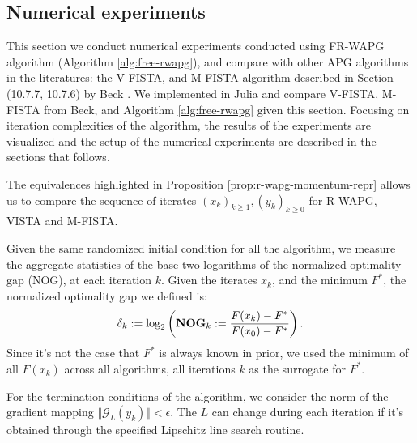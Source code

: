 \documentclass[12pt]{article}
\begin{document}
    \subsection{Numerical experiments}
        This section we conduct numerical experiments conducted using FR-WAPG algorithm (Algorithm \ref{alg:free-rwapg}), and compare with other APG algorithms in the literatures: the V-FISTA, and M-FISTA algorithm described in Section (10.7.7, 10.7.6) by Beck \cite{beck_first-order_2017}. 
        We implemented in Julia \cite{bezanson_julia_2017} and compare V-FISTA, M-FISTA from Beck, and Algorithm \ref{alg:free-rwapg} given this section. 
        Focusing on iteration complexities of the algorithm, the results of the experiments are visualized and the setup of the numerical experiments are described  in the sections that follows. 
        \par
        The equivalences highlighted in Proposition \ref{prop:r-wapg-momentum-repr} allows us to compare the sequence of iterates $(x_k)_{k \ge 1}, (y_k)_{k \ge0}$ for R-WAPG, VISTA and M-FISTA. 
        \par
        Given the same randomized initial condition for all the algorithm, we measure the aggregate statistics of the base two logarithms of the normalized optimality gap (NOG), at each iteration $k$.  
        Given the iterates $x_k$, and the minimum $F^*$, the normalized optimality gap we defined is: 
        \newcommand{\NOG}{\text{\textbf{NOG}}}
        \begin{align*}
            \delta_k := \log_2\left(
                \NOG_k := \frac{F(x_k) - F^*}{F(x_0) - F^*}
            \right). 
        \end{align*}
        Since it's not the case that $F^*$ is always known in prior, we used the minimum of all $F(x_k)$ across all algorithms, all iterations $k$ as the surrogate for $F^*$. 
        \par 
        For the termination conditions of the algorithm, we consider the norm of the gradient mapping $\Vert \mathcal G_L(y_k)\Vert < \epsilon$. 
        The $L$ can change during each iteration if it's obtained through the specified Lipschitz line search routine. 
\end{document}
